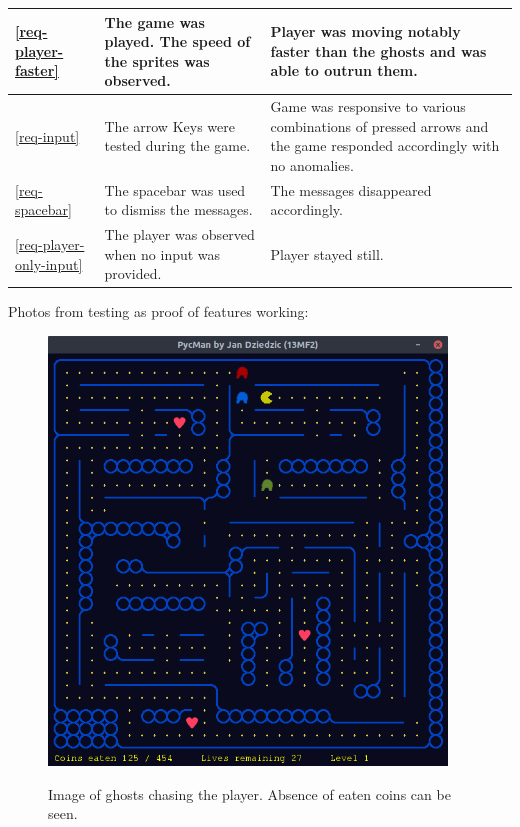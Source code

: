\documentclass[11pt,a4paper,notitlepage]{report}
\newenvironment{img}{
	\begin{center}
		\begin{figure}[H]
			\begin{center}
			
}{
	\end{center}
		\end{figure}
			\end{center}
}
\begin{document}
\begin{center}
\begin{longtable}{ | p{2cm} | p{5cm} | p{4cm} |}
					\ref{req-player-faster}&The game was played. The speed of the sprites was observed.&Player was moving notably faster than the ghosts and was able to outrun them.\\ \hline
					\ref{req-input}&The arrow Keys were tested during the game.&Game was responsive to various combinations of pressed arrows and the game responded accordingly with no anomalies.\\ \hline
					\ref{req-spacebar}&The spacebar was used to dismiss the messages.&The messages disappeared accordingly.\\ \hline
					\ref{req-player-only-input}&The player was observed when no input was provided.&Player stayed still.\\ \hline
				\end{longtable}
			\end{center}
			Photos from testing as proof of features working:\\
			\begin{img}
				\includegraphics[width=300pt]{images/ghosts-chasing0.png}\\
				\caption{Image of ghosts chasing the player. Absence of eaten coins can be seen.}
			\end{img}
			
			
\end{document}
